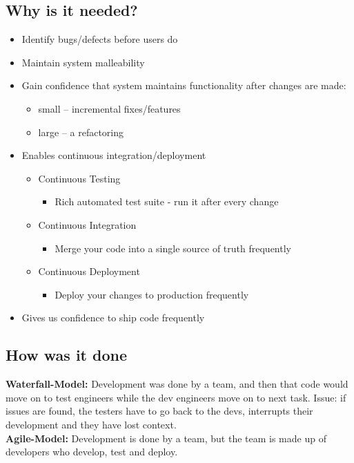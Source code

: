 \documentclass{report}
\begin{document}
\subsection{Why is it needed?}
\begin{itemize}
	\item Identify bugs/defects before users do
	\item Maintain system malleability
	\item Gain confidence that system maintains functionality after changes are made:
	      \begin{itemize}
		      \item small – incremental fixes/features
		      \item large – a refactoring
	      \end{itemize}
	\item Enables continuous integration/deployment
	      \begin{itemize}
		      \item Continuous Testing
		            \begin{itemize}
			            \item Rich automated test suite - run it after every change
		            \end{itemize}
		      \item Continuous Integration
		            \begin{itemize}
			            \item Merge your code into a single source of truth frequently
		            \end{itemize}
		      \item Continuous Deployment
		            \begin{itemize}
			            \item Deploy your changes to production frequently
		            \end{itemize}
	      \end{itemize}
	\item Gives us confidence to ship code frequently
\end{itemize}



\subsection*{How was it done}

\textbf{Waterfall-Model:} Development was done by a team, and then that code would move on to test engineers while the dev engineers move on to next task. Issue: if issues are found, the testers have to go back to the devs, interrupts their development and they have lost context.\\
\textbf{Agile-Model:} Development is done by a team, but the team is made up of developers who develop, test and deploy. \\
\end{document}
